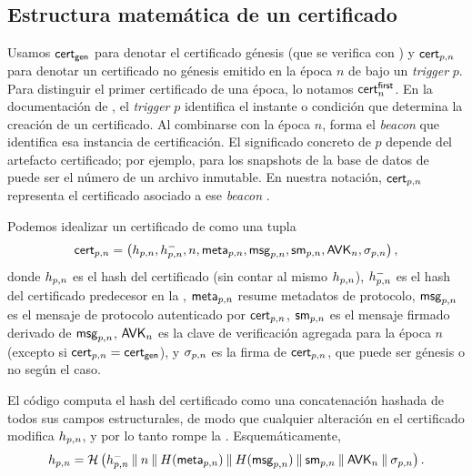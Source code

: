 \subsection{Estructura matemática de un certificado}
\label{subsec:cadena-de-certificados-estructura-matematica-de-un-certificado}

Usamos $\mathsf{cert}_{\mathsf{gen}}$ para denotar el certificado génesis (que se verifica con \GenesisVerificationKey) y $\mathsf{cert}_{p,n}$ para denotar un certificado no génesis emitido en la época $n$ de \Cardano bajo un \textit{trigger} \(p\). Para distinguir el primer certificado de una época, lo notamos $\mathsf{cert}^{\mathsf{first}}_{n}$. En la documentación de \Mithril, el \textit{trigger} $p$ identifica el instante o condición que determina la creación de un certificado. Al combinarse con la época $n$, forma el \textit{beacon} que identifica esa instancia de certificación. El significado concreto de $p$ depende del artefacto certificado; por ejemplo, para los snapshots de la base de datos de \Cardano puede ser el número de un archivo inmutable. En nuestra notación, $\mathsf{cert}_{p,n}$ representa el certificado asociado a ese \textit{beacon} \cite{MithrilDocsCertChain}.

Podemos idealizar un certificado de \Mithril como una tupla
$$\mathsf{cert}_{p,n} = \left(h_{p,n}, h^{-}_{p,n}, n, \mathsf{meta}_{p,n}, \mathsf{msg}_{p,n}, \mathsf{sm}_{p,n}, \mathsf{AVK}_n, \sigma_{p,n} \right),$$
donde $h_{p,n}$ es el hash del certificado (sin contar al mismo $h_{p,n}$), $h^{-}_{p,n}$ es el hash del certificado predecesor en la \CertificateChain, $\mathsf{meta}_{p,n}$ resume metadatos de protocolo, $\mathsf{msg}_{p,n}$ es el mensaje de protocolo autenticado por $\mathsf{cert}_{p,n}$, $\mathsf{sm}_{p,n}$ es el mensaje firmado derivado de $\mathsf{msg}_{p,n}$, $\mathsf{AVK}_n$ es la clave de verificación agregada para la época $n$ (excepto si $\mathsf{cert}_{p,n} = \mathsf{cert}_{\mathsf{gen}}$), y $\sigma_{p,n}$ es la firma de $\mathsf{cert}_{p,n}$, que puede ser génesis o no según el caso.

El código computa el hash del certificado como una concatenación hashada de todos sus campos estructurales, de modo que cualquier alteración en el certificado modifica $h_{p,n}$, y por lo tanto rompe la \CertificateChain. Esquemáticamente,
$$h_{p,n} = \mathcal{H}\left(h^{-}_{p,n} \mathbin{\|} n \mathbin{\|} H(\mathsf{meta}_{p,n}) \mathbin{\|} H(\mathsf{msg}_{p,n}) \mathbin{\|} \mathsf{sm}_{p,n} \mathbin{\|} \mathsf{AVK}_n \mathbin{\|} \sigma_{p,n} \right).$$

